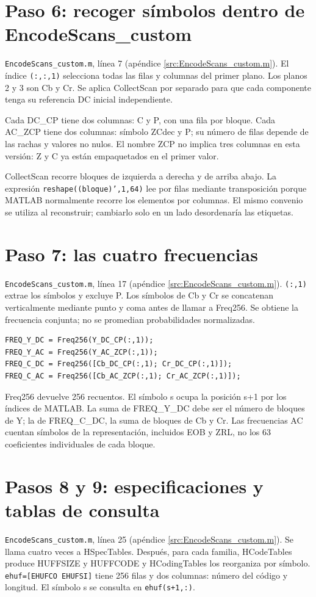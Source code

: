 \documentclass[11pt,a4paper,oneside]{report}
\begin{document}
\section{Paso 6: recoger símbolos dentro de EncodeScans\_custom}
\texttt{EncodeScans\_custom.m}, línea 7 (apéndice \ref{src:EncodeScans_custom.m}).
El índice \texttt{(:,:,1)} selecciona todas las filas y columnas del primer plano.
Los planos 2 y 3 son Cb y Cr. Se aplica CollectScan por separado para que cada
componente tenga su referencia DC inicial independiente.

Cada DC\_CP tiene dos columnas: C y P, con una fila por bloque. Cada AC\_ZCP
tiene dos columnas: símbolo ZCdec y P; su número de filas depende de las rachas
y valores no nulos. El nombre ZCP no implica tres columnas en esta versión:
Z y C ya están empaquetados en el primer valor.

CollectScan recorre bloques de izquierda a derecha y de arriba abajo. La expresión
\texttt{reshape((bloque)',1,64)} lee por filas mediante transposición porque
MATLAB normalmente recorre los elementos por columnas. El mismo convenio se
utiliza al reconstruir; cambiarlo solo en un lado desordenaría las etiquetas.


\section{Paso 7: las cuatro frecuencias}
\texttt{EncodeScans\_custom.m}, línea 17 (apéndice \ref{src:EncodeScans_custom.m}).
\texttt{(:,1)} extrae los símbolos y excluye P. Los símbolos de Cb y Cr se
concatenan verticalmente mediante punto y coma antes de llamar a Freq256.
Se obtiene la frecuencia conjunta; no se promedian probabilidades normalizadas.


\begin{lstlisting}
FREQ_Y_DC = Freq256(Y_DC_CP(:,1));
FREQ_Y_AC = Freq256(Y_AC_ZCP(:,1));
FREQ_C_DC = Freq256([Cb_DC_CP(:,1); Cr_DC_CP(:,1)]);
FREQ_C_AC = Freq256([Cb_AC_ZCP(:,1); Cr_AC_ZCP(:,1)]);
\end{lstlisting}


Freq256 devuelve 256 recuentos. El símbolo s ocupa la posición s+1 por los
índices de MATLAB. La suma de FREQ\_Y\_DC debe ser el número de bloques de Y;
la de FREQ\_C\_DC, la suma de bloques de Cb y Cr. Las frecuencias AC cuentan
símbolos de la representación, incluidos EOB y ZRL, no los 63 coeficientes
individuales de cada bloque.

\section{Pasos 8 y 9: especificaciones y tablas de consulta}
\texttt{EncodeScans\_custom.m}, línea 25 (apéndice \ref{src:EncodeScans_custom.m}).
Se llama cuatro veces a HSpecTables. Después, para cada familia,
HCodeTables produce HUFFSIZE y HUFFCODE y HCodingTables los reorganiza por símbolo.
\texttt{ehuf=[EHUFCO EHUFSI]} tiene 256 filas y dos columnas: número del código
y longitud. El símbolo s se consulta en \texttt{ehuf(s+1,:)}.
\end{document}
